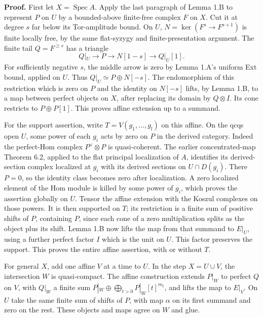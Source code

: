 \documentclass[11pt]{article}
\begin{document}
\textbf{Proof.} First let \(X=\operatorname{Spec}A\). Apply the last
paragraph of Lemma 1.B to represent \(P\) on \(U\) by a bounded-above
finite-free complex \(F\) on \(X\). Cut it at degree \(s\) far below its
Tor-amplitude bound. On \(U\), \(N=\ker(F^s\to F^{s+1})\) is finite
locally free, by the same flat-syzygy and finite-presentation argument.
The finite tail \(Q=F^{\ge s}\) has a triangle \[
Q|_U\longrightarrow P\longrightarrow N[1-s]\longrightarrow Q|_U[1].
\] For sufficiently negative \(s\), the middle arrow is zero by Lemma
1.A's uniform Ext bound, applied on \(U\). Thus
\(Q|_U\simeq P\oplus N[-s]\). The endomorphism of this restriction which
is zero on \(P\) and the identity on \(N[-s]\) lifts, by Lemma 1.B, to a
map between perfect objects on \(X\), after replacing its domain by
\(Q\otimes I\). Its cone restricts to \(P\oplus P[1]\). This proves
affine extension up to a summand.

For the support assertion, write \(T=V(g_1,\ldots,g_l)\) on this affine.
On the qcqs open \(U\), some power of each \(g_i\) acts by zero on \(P\)
in the derived category. Indeed the perfect-Hom complex
\(P^\vee\otimes P\) is quasi-coherent. The earlier concentrated-map
Theorem 6.2, applied to the flat principal localization of \(A\),
identifies its derived-section complex localized at \(g_i\) with its
derived sections on \(U\cap D(g_i)\). There \(P=0\), so the identity
class becomes zero after localization. A zero localized element of the
Hom module is killed by some power of \(g_i\), which proves the
assertion globally on \(U\). Tensor the affine extension with the Koszul
complexes on those powers. It is then supported on \(T\); its
restriction is a finite sum of positive shifts of \(P\), containing
\(P\), since each cone of a zero multiplication splits as the object
plus its shift. Lemma 1.B now lifts the map from that summand to
\(E|_U\), using a further perfect factor \(I\) which is the unit on
\(U\). This factor preserves the support. This proves the entire affine
assertion, with or without \(T\).

For general \(X\), add one affine \(V\) at a time to \(U\). In the step
\(X=U\cup V\), the intersection \(W\) is quasi-compact. The affine
construction extends \(P|_W\) to perfect \(Q\) on \(V\), with \(Q|_W\) a
finite sum \(P|_W\oplus\bigoplus_{t>0}P|_W[t]^{m_t}\), and lifts the map
to \(E|_V\). On \(U\) take the same finite sum of shifts of \(P\), with
map \(\alpha\) on its first summand and zero on the rest. These objects
and maps agree on \(W\) and glue.
\end{document}

